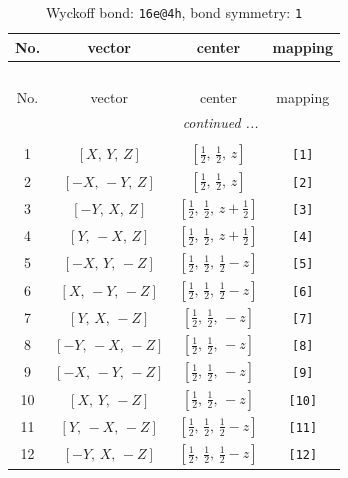\documentclass[fleqn,8pt]{jsarticle}
\begin{document}
\begin{longtable}{cccc}
\caption{Wyckoff bond: {\tt 16e@4h}, bond symmetry: {\tt 1}}
 \\
 \hline \hline
No. & vector & center & mapping \\ \hline \endfirsthead

\multicolumn{3}{l}{\tablename\ \thetable{}} \\
 \hline \hline
No. & vector & center & mapping \\ \hline \endhead

 \hline \hline
\multicolumn{3}{r}{\footnotesize\it continued ...} \\ \endfoot

 \hline \hline
\multicolumn{3}{r}{} \\ \endlastfoot

1 & $\left[ X,\, Y,\, Z \right]$ & $\left[ \frac{1}{2},\, \frac{1}{2},\, z \right]$ & {\tt [1]} \\ \hline
2 & $\left[ - X,\, - Y,\, Z \right]$ & $\left[ \frac{1}{2},\, \frac{1}{2},\, z \right]$ & {\tt [2]} \\ \hline
3 & $\left[ - Y,\, X,\, Z \right]$ & $\left[ \frac{1}{2},\, \frac{1}{2},\, z + \frac{1}{2} \right]$ & {\tt [3]} \\ \hline
4 & $\left[ Y,\, - X,\, Z \right]$ & $\left[ \frac{1}{2},\, \frac{1}{2},\, z + \frac{1}{2} \right]$ & {\tt [4]} \\ \hline
5 & $\left[ - X,\, Y,\, - Z \right]$ & $\left[ \frac{1}{2},\, \frac{1}{2},\, \frac{1}{2} - z \right]$ & {\tt [5]} \\ \hline
6 & $\left[ X,\, - Y,\, - Z \right]$ & $\left[ \frac{1}{2},\, \frac{1}{2},\, \frac{1}{2} - z \right]$ & {\tt [6]} \\ \hline
7 & $\left[ Y,\, X,\, - Z \right]$ & $\left[ \frac{1}{2},\, \frac{1}{2},\, - z \right]$ & {\tt [7]} \\ \hline
8 & $\left[ - Y,\, - X,\, - Z \right]$ & $\left[ \frac{1}{2},\, \frac{1}{2},\, - z \right]$ & {\tt [8]} \\ \hline
9 & $\left[ - X,\, - Y,\, - Z \right]$ & $\left[ \frac{1}{2},\, \frac{1}{2},\, - z \right]$ & {\tt [9]} \\ \hline
10 & $\left[ X,\, Y,\, - Z \right]$ & $\left[ \frac{1}{2},\, \frac{1}{2},\, - z \right]$ & {\tt [10]} \\ \hline
11 & $\left[ Y,\, - X,\, - Z \right]$ & $\left[ \frac{1}{2},\, \frac{1}{2},\, \frac{1}{2} - z \right]$ & {\tt [11]} \\ \hline
12 & $\left[ - Y,\, X,\, - Z \right]$ & $\left[ \frac{1}{2},\, \frac{1}{2},\, \frac{1}{2} - z \right]$ & {\tt [12]} \\ \hline

\end{longtable}
\end{document}
